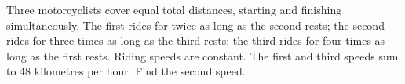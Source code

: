 Three motorcyclists cover equal total distances, starting and finishing simultaneously. The first rides for twice as long as the second rests; the second rides for three times as long as the third rests; the third rides for four times as long as the first rests. Riding speeds are constant. The first and third speeds sum to 48 kilometres per hour. Find the second speed.
